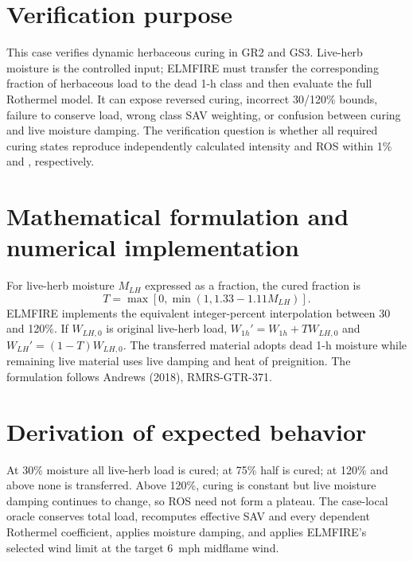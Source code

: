 \section{Verification purpose}
This case verifies dynamic herbaceous curing in GR2 and GS3.  Live-herb moisture is the controlled input; ELMFIRE must transfer the corresponding fraction of herbaceous load to the dead 1-h class and then evaluate the full Rothermel model.  It can expose reversed curing, incorrect 30/120\% bounds, failure to conserve load, wrong class SAV weighting, or confusion between curing and live moisture damping.  The verification question is whether all required curing states reproduce independently calculated intensity and ROS within 1\% and \RosTolerance{}, respectively.

\section{Mathematical formulation and numerical implementation}
For live-herb moisture $M_{LH}$ expressed as a fraction, the cured fraction is
\begin{equation}T=\max[0,\min(1,1.33-1.11M_{LH})].\end{equation}
ELMFIRE implements the equivalent integer-percent interpolation between 30 and 120\%.  If $W_{LH,0}$ is original live-herb load, $W_{1h}'=W_{1h}+TW_{LH,0}$ and $W_{LH}'=(1-T)W_{LH,0}$.  The transferred material adopts dead 1-h moisture while remaining live material uses live damping and heat of preignition.  The formulation follows Andrews (2018), RMRS-GTR-371.

\section{Derivation of expected behavior}
At 30\% moisture all live-herb load is cured; at 75\% half is cured; at 120\% and above none is transferred.  Above 120\%, curing is constant but live moisture damping continues to change, so ROS need not form a plateau.  The case-local oracle conserves total load, recomputes effective SAV and every dependent Rothermel coefficient, applies moisture damping, and applies ELMFIRE's selected wind limit at the target \SI{6}{mph} midflame wind.

